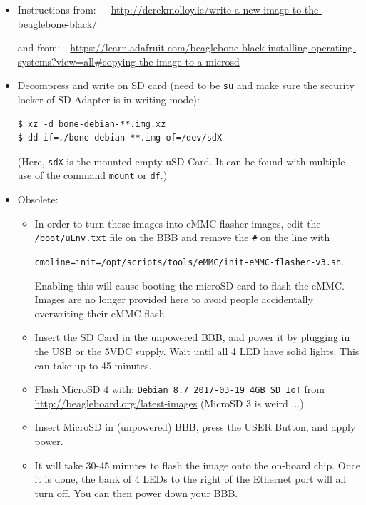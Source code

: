 \documentclass[
	fontsize=10pt
	paper=a4
]{scrartcl}
\begin{document}
\begin{itemize}
\item Instructions from:~~~\url{http://derekmolloy.ie/write-a-new-image-to-the-beaglebone-black/}

and from:~~\url{https://learn.adafruit.com/beaglebone-black-installing-operating-systems?view=all#copying-the-image-to-a-microsd}

\item Decompress and write on SD card (need to be \texttt{su} and make sure the security locker of SD Adapter is in writing mode):
\begin{lstlisting}
$ xz -d bone-debian-**.img.xz
$ dd if=./bone-debian-**.img of=/dev/sdX
\end{lstlisting}

(Here, \texttt{sdX} is the mounted empty uSD Card. It can be found with multiple use of the command \texttt{mount} or \texttt{df}.)


\item Obsolete:
\begin{footnotesize}
\begin{itemize}

\item In order to turn these images into eMMC flasher images, edit the \texttt{/boot/uEnv.txt} file on the BBB and remove the \texttt{\#} on the line with 

\texttt{cmdline=init=/opt/scripts/tools/eMMC/init-eMMC-flasher-v3.sh}. 

Enabling this will cause booting the microSD card to flash the eMMC. Images are no longer provided here to avoid people accidentally overwriting their eMMC flash.

\item Insert the SD Card in the unpowered BBB, and power it by plugging in the USB or the 5VDC supply. Wait until all 4 LED have solid lights. This can take up to 45 minutes. 


\item Flash MicroSD 4 with: \texttt{Debian 8.7 2017-03-19 4GB SD IoT} from \url{http://beagleboard.org/latest-images} (MicroSD 3 is weird ...).

\item Insert MicroSD in (unpowered) BBB, press the USER Button, and apply power.

\item It will take 30-45 minutes to flash the image onto the on-board chip. Once it is done, the bank of 4 LEDs to the right of the Ethernet port will all turn off. You can then power down your BBB.

\end{itemize}

\end{footnotesize}

\end{itemize}
\end{document}
